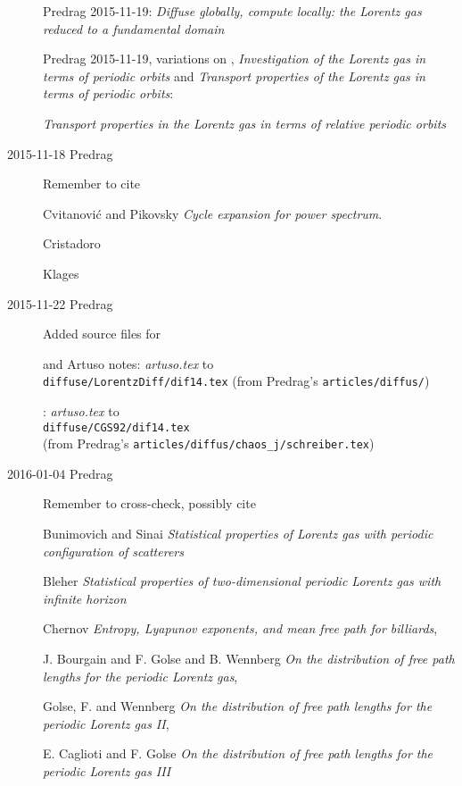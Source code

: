 \begin{description}
Predrag 2015-11-19: {\em Diffuse globally, compute locally:
            the {Lorentz} gas reduced to a fundamental domain}

Predrag 2015-11-19, variations on ,
{\em Investigation of the Lorentz gas in terms of periodic orbits}
and
{\em Transport properties of the {Lorentz} gas
           in terms of periodic orbits}:

{\em Transport properties in the {Lorentz} gas
           in terms of relative periodic orbits}

\item[2015-11-18 Predrag]
Remember to cite

Cvitanovi\'c and
    Pikovsky {\em Cycle expansion for power spectrum}.

Cristadoro

Klages

\item[2015-11-22 Predrag] Added source files for

and Artuso notes:
\emph{artuso.tex} to \\
\texttt{diffuse/LorentzDiff/dif14.tex}
(from Predrag's \texttt{articles/diffus/})

: \emph{artuso.tex} to \\
\texttt{diffuse/CGS92/dif14.tex}\\
(from Predrag's \texttt{articles/diffus/chaos\_j/schreiber.tex})

\item[2016-01-04 Predrag] Remember to cross-check, possibly cite

Bunimovich and Sinai
{\em Statistical properties of {Lorentz} gas with periodic configuration of scatterers}

Bleher
{\em Statistical properties of two-dimensional periodic Lorentz gas with infinite horizon}

Chernov {\em Entropy, {Lyapunov} exponents, and mean free path for billiards},

J. Bourgain and F. Golse and B. Wennberg
{\em On the distribution of free path lengths for the periodic Lorentz gas},

Golse, F. and Wennberg
{\em On the distribution of free path lengths for the periodic Lorentz gas II},

E. Caglioti and F. Golse
{\em On the distribution of free path lengths for the periodic Lorentz gas III}


\end{description}
